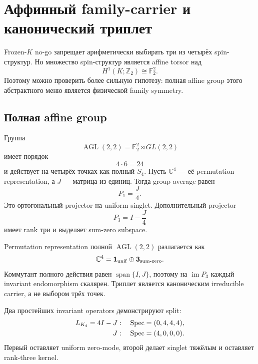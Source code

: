 \chapter{Аффинный family-carrier и канонический триплет}

Frozen-\(K\) no-go запрещает арифметически выбирать три из четырёх
spin-структур. Но множество spin-структур является affine torsor над
\begin{equation}
H^1(K;\mathbb Z_2)\cong\mathbb F_2^2.
\end{equation}
Поэтому можно проверить более сильную гипотезу: полная affine group этого
абстрактного меню является физической family symmetry.

\section{Полная affine group}

Группа
\begin{equation}
\operatorname{AGL}(2,2)=\mathbb F_2^2\rtimes GL(2,2)
\end{equation}
имеет порядок
\begin{equation}
4\cdot6=24
\end{equation}
и действует на четырёх точках как полный \(S_4\). Пусть
\(\mathbb C^4\) --- её permutation representation, а \(J\) --- матрица из
единиц. Тогда group average равен
\begin{equation}
P_1=\frac{J}{4}.
\end{equation}
Это ортогональный projector на uniform singlet. Дополнительный projector
\begin{equation}
P_3=I-\frac{J}{4}
\end{equation}
имеет rank три и выделяет sum-zero subspace.

\begin{theorem}
Permutation representation полной \(\operatorname{AGL}(2,2)\) разлагается
как
\begin{equation}
\mathbb C^4=\mathbf1_{\rm unif}\oplus\mathbf3_{\rm sum\text{-}zero}.
\end{equation}
Коммутант полного действия равен \(\operatorname{span}\{I,J\}\), поэтому на
\(\operatorname{im}P_3\) каждый invariant endomorphism скалярен. Триплет
является каноническим irreducible carrier, а не выбором трёх точек.
\end{theorem}

Два простейших invariant operators демонстрируют split:
\begin{align}
L_{K_4}=4I-J&:\quad \operatorname{Spec}=(0,4,4,4),\\
J&:\quad \operatorname{Spec}=(4,0,0,0).
\end{align}
Первый оставляет uniform zero-mode, второй делает singlet тяжёлым и оставляет
rank-three kernel.

